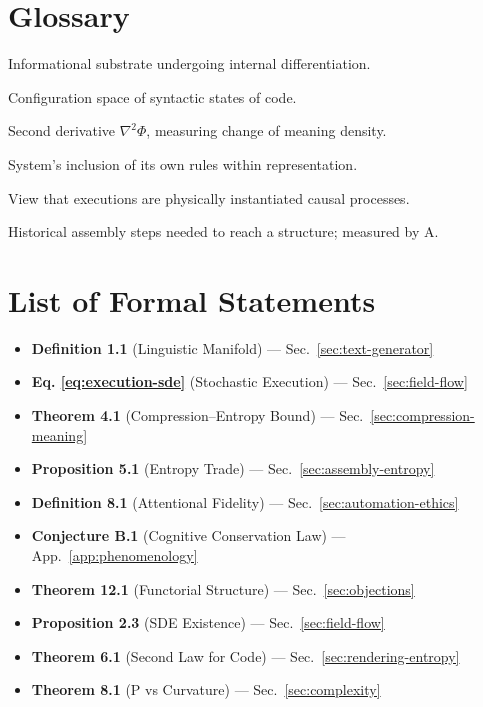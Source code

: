 \documentclass[12pt,a4paper]{article}
\theoremstyle{plain}
\theoremstyle{definition}
\theoremstyle{remark}
\newcommand{\Phifield}{\Phi}
\newcommand{\AI}{\mathrm{A}}
\begin{document}
\section*{Glossary}

\begin{description}[leftmargin=2em,style=nextline]
\item[Plenum] Informational substrate undergoing internal differentiation.
\item[Linguistic Manifold] Configuration space of syntactic states of code.
\item[Semantic Curvature] Second derivative $\nabla^2\Phifield$, measuring change of meaning density.
\item[Reflexivity] System’s inclusion of its own rules within representation.
\item[Computational Realism] View that executions are physically instantiated causal processes.
\item[Causal Depth] Historical assembly steps needed to reach a structure; measured by $\AI$.
\end{description}

\section*{List of Formal Statements}

\begin{itemize}
  \item \textbf{Definition 1.1} (Linguistic Manifold) — Sec.~\ref{sec:text-generator}
  \item \textbf{Eq. \eqref{eq:execution-sde}} (Stochastic Execution) — Sec.~\ref{sec:field-flow}
  \item \textbf{Theorem 4.1} (Compression–Entropy Bound) — Sec.~\ref{sec:compression-meaning}
  \item \textbf{Proposition 5.1} (Entropy Trade) — Sec.~\ref{sec:assembly-entropy}
  \item \textbf{Definition 8.1} (Attentional Fidelity) — Sec.~\ref{sec:automation-ethics}
  \item \textbf{Conjecture B.1} (Cognitive Conservation Law) — App.~\ref{app:phenomenology}
  \item \textbf{Theorem 12.1} (Functorial Structure) — Sec.~\ref{sec:objections}
  \item \textbf{Proposition 2.3} (SDE Existence) — Sec.~\ref{sec:field-flow}
  \item \textbf{Theorem 6.1} (Second Law for Code) — Sec.~\ref{sec:rendering-entropy}
  \item \textbf{Theorem 8.1} (P vs Curvature) — Sec.~\ref{sec:complexity}
\end{itemize}
\end{document}
